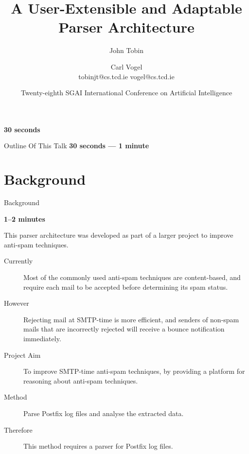 \documentclass{beamer}
\title{A User-Extensible and Adaptable Parser Architecture}
\author[John Tobin \and Carl Vogel]{John Tobin \and Carl Vogel\\
    tobinjt@cs.tcd.ie vogel@cs.tcd.ie}
\institute[Trinity College]
{
    School of Computer Science and Statistics,\\
    Trinity College, University of Dublin
}
\date[SGAI 2008]{Twenty-eighth SGAI International Conference on Artificial Intelligence}
\newcommand{\timingnote}[1]{%
    \textbf{#1}%
}
\begin{document}
\begin{frame}
    \timingnote{30 seconds}
    \titlepage{}
\end{frame}

\begin{frame}{Outline Of This Talk}
    \timingnote{30 seconds --- 1 minute}
    \tableofcontents{}
\end{frame}





\section{Background}

\begin{frame}{Background}

    \timingnote{1--2 minutes}

    This parser architecture was developed as part of a larger project to
    improve anti-spam techniques.

    \begin{description}

        \item [Currently] Most of the commonly used anti-spam techniques
            are content-based, and require each mail to be accepted before
            determining its spam status.

        \item [However] Rejecting mail at SMTP-time is more efficient, and
            senders of non-spam mails that are incorrectly rejected will
            receive a bounce notification immediately.

        \item [Project Aim] To improve SMTP-time anti-spam techniques, by
            providing a platform for reasoning about anti-spam techniques.

        \item [Method] Parse Postfix log files and analyse the
            extracted data.

        \item [Therefore] This method requires a parser for Postfix log
            files.

    \end{description}

\end{frame}
\end{document}
